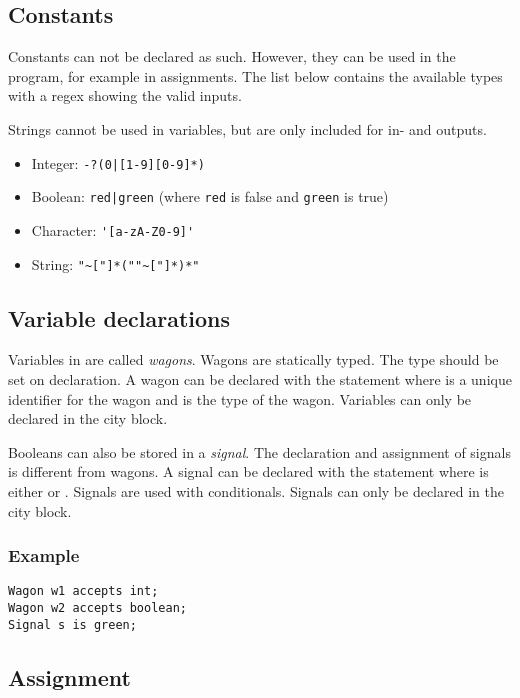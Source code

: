 \subsection{Constants}

Constants can not be declared as such. However, they can be used in the program, for example in assignments. The list below contains the available types with a regex showing the valid inputs.

Strings cannot be used in variables, but are only included for in- and outputs.

\begin{itemize}
\item Integer: \verb=-?(0|[1-9][0-9]*)=
\item Boolean: \verb=red|green= (where \verb|red| is false and \verb|green| is true)
\item Character: \verb='[a-zA-Z0-9]'=
\item String: \verb="~["]*(""~["]*)*"=
\end{itemize}

\subsection{Variable declarations}

Variables in \shortname are called \emph{wagons}. Wagons are statically typed. The type should be set on declaration.
A wagon can be declared with the statement  where  is a unique identifier for the wagon and  is the type of the wagon. Variables can only be declared in the  city block.

Booleans can also be stored in a \emph{signal}. The declaration and assignment of signals is different from wagons. A signal can be declared with the statement  where  is either  or . Signals are used with conditionals. Signals can only be declared in the  city block.

\subsubsection*{Example}

\begin{lstlisting}
Wagon w1 accepts int;
Wagon w2 accepts boolean;
Signal s is green;
\end{lstlisting}

\subsection{Assignment}

